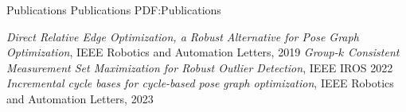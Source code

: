 \documentclass[letterpaper,MMMyyyy,nonstopmode]{simpleresumecv}
\begin{document}
\begin{Body}




\Section
{Publications}
{Publications}
{PDF:Publications}

\BulletItem
\textit{Direct Relative Edge Optimization, a Robust Alternative for Pose Graph Optimization}, IEEE Robotics and Automation Letters, 2019
\BulletItem \textit{Group-$k$ Consistent Measurement Set Maximization for Robust Outlier Detection}, IEEE IROS 2022
\BulletItem \textit{Incremental cycle bases for cycle-based pose graph optimization}, IEEE Robotics and Automation Letters, 2023


\end{Body}

\thispagestyle{empty}
\end{document}
